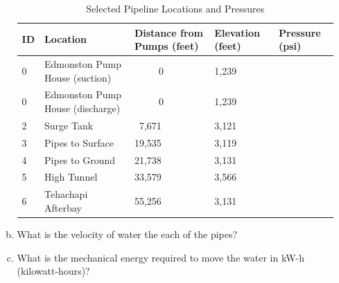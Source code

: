 \documentclass[12pt]{article}
\begin{document}
\begin{enumerate}
\begin{enumerate}[a)]
\begin{table}[h!]
   \centering
    \caption{Selected Pipeline Locations and Pressures }
   \begin{tabular}{p{0.5in}p{2in}p{1in}p{0.7in}p{0.7in}} %
\hline
\hline
ID & Location & Distance from Pumps (feet) & Elevation (feet) & Pressure (psi) \\
\hline
\hline
0& Edmonston Pump House (suction) & ~~~~~0  & 1,239 & ~~ \\
\hline
0& Edmonston Pump House (discharge)& ~~~~~0  & 1,239 & ~~ \\
\hline
2& Surge Tank & ~7,671 & 3,121 & ~~ \\
\hline
3& Pipes to Surface & 19,535 & 3,119 & ~~ \\
\hline
4& Pipes to Ground & 21,738 & 3,131 & ~~ \\
\hline
5& High Tunnel & 33,579 & 3,566 & ~~ \\
\hline
6& Tehachapi Afterbay & 55,256 & 3,131 & ~~ \\
\hline
   \end{tabular}
   \label{tab:pressures}
\end{table}
\item What is the velocity of water the each of the pipes?
\item What is the mechanical energy required to move the water in kW-h  (kilowatt-hours)?
    \end{enumerate}
\end{enumerate}
\end{document}
